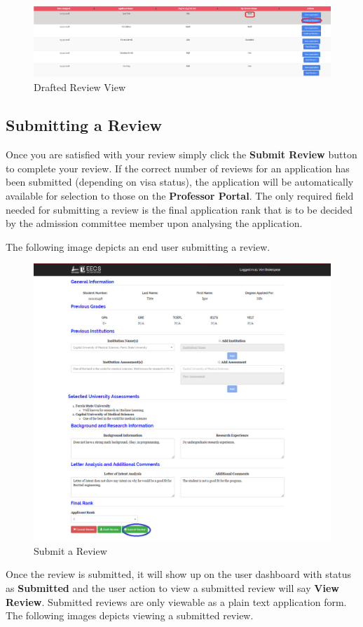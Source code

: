 \documentclass[fontsize=12pt,paper=letter,twoside]{scrartcl}
\begin{document}
\begin{figure}[!htb]
\begin{center}
\includegraphics[width=.9\textwidth]{images/drafted_review.png}
\end{center}
\caption{Drafted Review View}
\label{fig:drafted_review}
\end{figure}

\clearpage
\subsection{Submitting a Review}
Once you are satisfied with your review simply  click the \textbf{Submit Review} button to complete your review. If the correct number of reviews for an application has been submitted (depending on visa status), the application will be automatically available for selection to those on the \textbf{Professor Portal}. The only required field needed for submitting a review is the final application rank that is to be decided by the admission committee member upon analysing the application.

\bigskip
\noindent The following image depicts an end user submitting a review. 

\begin{figure}[!htb]
\begin{center}
\includegraphics[width=.8\textwidth]{images/submit_review.png}
\end{center}
\caption{Submit a Review}
\label{fig:submit_review}
\end{figure}
\clearpage
\bigskip
\noindent Once the review is submitted, it will show up on the user dashboard with status as \textbf{Submitted} and the user action to view a submitted review will say \textbf{View Review}. Submitted reviews are only viewable as a plain text application form. The following images depicts viewing a submitted review.
\end{document}
